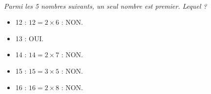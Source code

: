 \documentclass[11pt]{article}
\begin{document}
\\
\textit{Parmi les 5 nombres suivants, un seul nombre est premier. Lequel ?}
\begin{multicols}{3}
\begin{itemize}
    \item 12 : $12 = 2 \times 6$ : NON.
    \item 13 : OUI.
    \item 14 : $14 = 2 \times 7$ : NON.
    \item 15 : $15 = 3 \times 5$ : NON. 
    \item 16 : $16 = 2 \times 8$ : NON.
\end{itemize}
\end{multicols}
\end{document}
